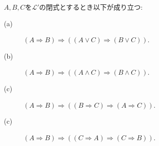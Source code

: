 	\begin{screen}
		\begin{metathm}[含意は遺伝する]\label{metathm:rule_of_inference_1}
			$A,B,C$を$\mathcal{L}'$の閉式とするとき以下が成り立つ:
			\begin{description}
				\item[(a)] $(A \Longrightarrow B) \Longrightarrow ( (A \vee C) \Longrightarrow (B \vee C) )$.
				
				\item[(b)] $(A \Longrightarrow B) \Longrightarrow ( (A \wedge C) \Longrightarrow (B \wedge C) )$.
				
				\item[(c)] $(A \Longrightarrow B) \Longrightarrow ( (B \Longrightarrow C) \Longrightarrow (A \Longrightarrow C) )$.
				
				\item[(c)] $(A \Longrightarrow B) \Longrightarrow ( (C \Longrightarrow A) \Longrightarrow (C \Longrightarrow B) )$.
			\end{description}
		\end{metathm}
	\end{screen}
	
